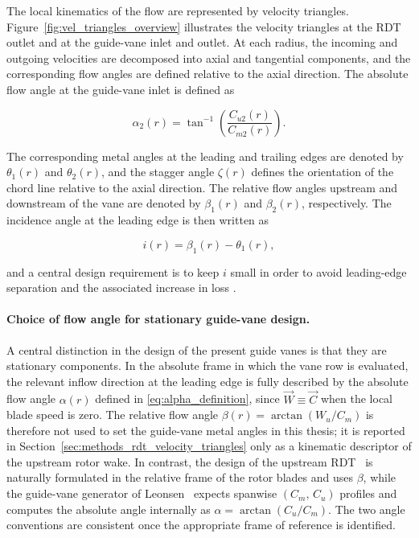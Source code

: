 The local kinematics of the flow are represented by velocity triangles. Figure~\ref{fig:vel_triangles_overview} illustrates the velocity triangles at the RDT outlet and at the guide-vane inlet and outlet. At each radius, the incoming and outgoing velocities are decomposed into axial and tangential components, and the corresponding flow angles are defined relative to the axial direction. The absolute flow angle at the guide-vane inlet is defined as

\begin{equation}
\alpha_2(r) = \tan^{-1}\left(\frac{C_{u2}(r)}{C_{m2}(r)}\right).
\end{equation}

The corresponding metal angles at the leading and trailing edges are denoted by \(\theta_1(r)\) and \(\theta_2(r)\), and the stagger angle \(\zeta(r)\) defines the orientation of the chord line relative to the axial direction. The relative flow angles upstream and downstream of the vane are denoted by \(\beta_1(r)\) and \(\beta_2(r)\), respectively. The incidence angle at the leading edge is then written as

\begin{equation}
i(r) = \beta_1(r) - \theta_1(r),
\end{equation}

and a central design requirement is to keep \(i\) small in order to avoid leading-edge separation and the associated increase in loss \cite{DixonHall2014}.

\paragraph{Choice of flow angle for stationary guide-vane design.}
A central distinction in the design of the present guide vanes is that
they are stationary components. In the absolute frame in which the vane row is evaluated, the relevant inflow direction at the leading edge is fully described by the absolute flow angle $\alpha(r)$ defined in \eqref{eq:alpha_definition}, since $\vec{W}\equiv \vec{C}$ when the local blade speed is zero. The relative flow angle
$\beta(r)=\arctan(W_u/C_m)$ is therefore not used to set the
guide-vane metal angles in this thesis; it is reported in
Section~\ref{sec:methods_rdt_velocity_triangles} only as a kinematic
descriptor of the upstream rotor wake. In contrast, the design of the
upstream RDT~\cite{Verdijck2025} is naturally formulated in the
relative frame of the rotor blades and uses $\beta$, while the
guide-vane generator of Leonsen~\cite{Leonsen2025} expects spanwise
$(C_m,\,C_u)$ profiles and computes the absolute angle internally as
$\alpha = \arctan(C_u/C_m)$. The two angle conventions are consistent
once the appropriate frame of reference is identified.

